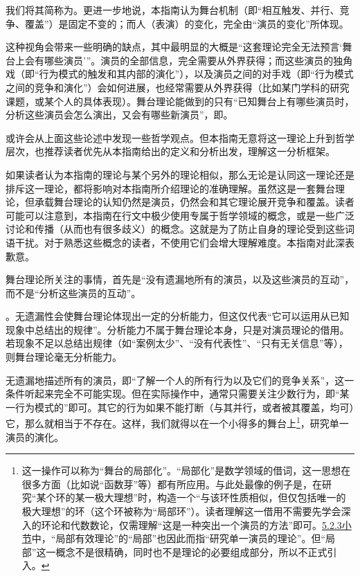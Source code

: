 \begin{explain}
我们将其简称为。更进一步地说，本指南认为舞台机制（即“相互触发、并行、竞争、覆盖”）是固定不变的；而人（表演）的变化，完全由“演员的变化”所体现。

这种视角会带来一些明确的缺点，其中最明显的大概是“这套理论完全无法预言‘舞台上会有哪些演员’”。演员的全部信息，完全需要从外界获得；而这些演员的独角戏（即“行为模式的触发和其内部的演化”），以及演员之间的对手戏（即“行为模式之间的竞争和演化”）会如何进展，也经常需要从外界获得（比如某门学科的研究课题，或某个人的具体表现）。舞台理论能做到的只有“已知舞台上有哪些演员时，分析这些演员会怎么演出，又会有哪些新演员”，即。

\trained 或许会从上面这些论述中发现一些哲学观点。但本指南无意将这一理论上升到哲学层次，也推荐读者优先从本指南给出的定义和分析出发，理解这一分析框架。

如果读者认为本指南的理论与某个另外的理论相似，那么无论是认同这一理论还是排斥这一理论，都将影响对本指南所介绍理论的准确理解。虽然这是一套舞台理论，但承载舞台理论的认知仍然是演员，仍然会和其它理论展开竞争和覆盖。读者可能可以注意到，本指南在行文中极少使用专属于哲学领域的概念，或是一些广泛讨论和传播（从而也有很多歧义）的概念。这就是为了防止自身的理论受到这些词语干扰。对于熟悉这些概念的读者，不使用它们会增大理解难度。本指南对此深表歉意。
\end{explain}
舞台理论所关注的事情，首先是“没有遗漏地所有的演员，以及这些演员的互动”，而不是“分析这些演员的互动”。
\begin{explain}
。无遗漏性会使舞台理论体现出一定的分析能力，但这仅代表“它可以运用从已知现象中总结出的规律”。分析能力不属于舞台理论本身，只是对演员理论的借用。若现象不足以总结出规律（如“案例太少”、“没有代表性”、“只有无关信息”等），则舞台理论毫无分析能力。

无遗漏地描述所有的演员，即“了解一个人的所有行为以及它们的竞争关系”，这一条件听起来完全不可能实现。但在实际操作中，通常只需要关注少数行为，即“某一行为模式的”即可。其它的行为如果不能打断（与其并行，或者被其覆盖，均可）它，那么就相当于不存在。这样，我们就得以在一个小得多的舞台上\footnote{\label{footnote:局部}这一操作可以称为“舞台的局部化”。“局部化”是数学领域的借词，这一思想在很多方面（比如说“函数芽”等）都有所应用。与此处最像的例子是，在研究“某个环的某一极大理想”时，构造一个“与该环性质相似，但仅包括唯一的极大理想”的环（这个环被称为“局部环”）。读者理解这一借用不需要先学会深入的环论和代数数论，仅需理解“这是一种突出一个演员的方法”即可。\hyperref[sec:局部有效理论]{5.2.3小节}中，“局部有效理论”的“局部”也因此而指“研究单一演员的理论”。但“局部”这一概念不是很精确，同时也不是理论的必要组成部分，所以不正式引入。}，研究单一演员的演化。
\end{explain}
